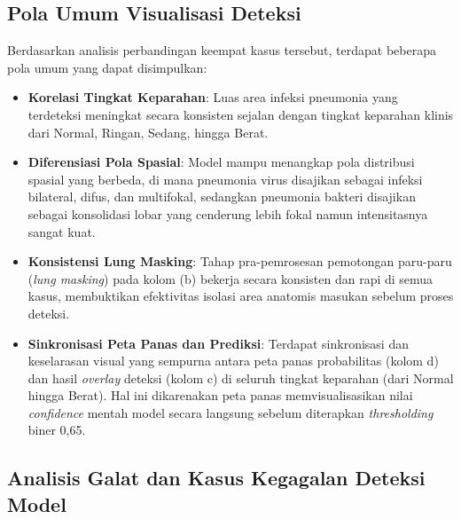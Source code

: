 \documentclass[12pt,a4paper,oneside]{book}
\begin{document}
\subsection{Pola Umum Visualisasi Deteksi}

Berdasarkan analisis perbandingan keempat kasus tersebut, terdapat beberapa pola umum yang dapat disimpulkan:
\begin{itemize}
  \item \textbf{Korelasi Tingkat Keparahan}: Luas area infeksi pneumonia yang terdeteksi meningkat secara konsisten sejalan dengan tingkat keparahan klinis dari Normal, Ringan, Sedang, hingga Berat.
  \item \textbf{Diferensiasi Pola Spasial}: Model mampu menangkap pola distribusi spasial yang berbeda, di mana pneumonia virus disajikan sebagai infeksi bilateral, difus, dan multifokal, sedangkan pneumonia bakteri disajikan sebagai konsolidasi lobar yang cenderung lebih fokal namun intensitasnya sangat kuat.
  \item \textbf{Konsistensi Lung Masking}: Tahap pra-pemrosesan pemotongan paru-paru (\textit{lung masking}) pada kolom (b) bekerja secara konsisten dan rapi di semua kasus, membuktikan efektivitas isolasi area anatomis masukan sebelum proses deteksi.
  \item \textbf{Sinkronisasi Peta Panas dan Prediksi}: Terdapat sinkronisasi dan keselarasan visual yang sempurna antara peta panas probabilitas (kolom d) dan hasil \textit{overlay} deteksi (kolom c) di seluruh tingkat keparahan (dari Normal hingga Berat). Hal ini dikarenakan peta panas memvisualisasikan nilai \textit{confidence} mentah model secara langsung sebelum diterapkan \textit{thresholding} biner 0,65.
\end{itemize}

\subsection{Analisis Galat dan Kasus Kegagalan Deteksi Model}
\end{document}
